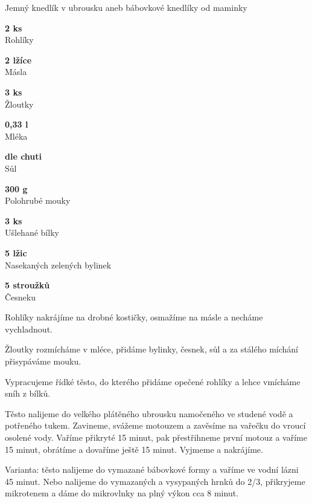 \documentclass[11pt,a4paper]{article}
\begin{document}
\begin{recipe}[Khaki]{Jemný knedlík v ubrousku aneb bábovkové knedlíky od maminky}
    \begin{ingredients}
        \item \parbox[t]{\linewidth}{\raggedright \piece \textbf{2 ks}\\ Rohlíky}
        \item \parbox[t]{\linewidth}{\raggedright \spoon \textbf{2 lžíce}\\ Másla}
        \item \parbox[t]{\linewidth}{\raggedright \piece \textbf{3 ks}\\ Žloutky}
        \item \parbox[t]{\linewidth}{\raggedright \liquid \textbf{0,33 l}\\ Mléka}
        \item \parbox[t]{\linewidth}{\raggedright \indefinite \textbf{dle chuti}\\ Sůl}
        \item \parbox[t]{\linewidth}{\raggedright \weight \textbf{300 g}\\ Polohrubé mouky}
        \item \parbox[t]{\linewidth}{\raggedright \piece \textbf{3 ks}\\ Ušlehané bílky}
        \item \parbox[t]{\linewidth}{\raggedright \spoon \textbf{5 lžic}\\ Nasekaných zelených bylinek}
        \item \parbox[t]{\linewidth}{\raggedright \piece \textbf{5 stroužků}\\ Česneku}
    \end{ingredients}
    \begin{steps}
        \item Rohlíky nakrájíme na drobné kostičky, osmažíme na másle a necháme vychladnout.
        \item Žloutky rozmícháme v mléce, přidáme bylinky, česnek, sůl a za stálého míchání přisypáváme mouku.
        \item Vypracujeme řídké těsto, do kterého přidáme opečené rohlíky a lehce vmícháme sníh z bílků.
        \item Těsto nalijeme do velkého plátěného ubrousku namočeného ve studené vodě a potřeného tukem. Zavineme, svážeme motouzem a zavěsíme na vařečku do vroucí osolené vody. Vaříme přikryté 15 minut, pak přestřihneme první motouz a vaříme 15 minut, obrátíme a dovaříme ještě 15 minut. Vyjmeme a nakrájíme.
        \item Varianta: těsto nalijeme do vymazané bábovkové formy a vaříme ve vodní lázni 45 minut. Nebo nalijeme do vymazaných a vysypaných hrnků do 2/3, přikryjeme mikrotenem a dáme do mikrovlnky na plný výkon cca 8 minut.
    \end{steps}
\end{recipe}
\end{document}
